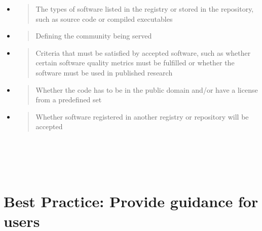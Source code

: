 \documentclass[]{article}
\begin{document}
\begin{itemize}
\item
  \begin{quote}
  The types of software listed in the registry or stored in the
  repository, such as source code or compiled executables
  \end{quote}
\item
  \begin{quote}
  Defining the community being served
  \end{quote}
\item
  \begin{quote}
  Criteria that must be satisfied by accepted software, such as whether
  certain software quality metrics must be fulfilled or whether the
  software must be used in published research
  \end{quote}
\item
  \begin{quote}
  Whether the code has to be in the public domain and/or have a license
  from a predefined set
  \end{quote}
\item
  \begin{quote}
  Whether software registered in another registry or repository will be
  accepted
  \end{quote}
\end{itemize}

\section{}\label{section}

\section{}\label{section-1}

\section{}\label{section-2}

\section{\texorpdfstring{\\
}{ }}\label{section-3}

\newpage
\section{Best Practice: Provide guidance for users
}\label{best-practice-provide-guidance-for-users}
\end{document}
